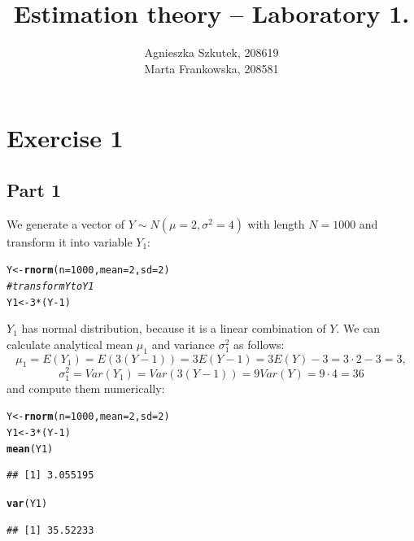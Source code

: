 \documentclass[12pt, a4paper]{article}\usepackage[]{graphicx}\usepackage[]{color}
\makeatletter
\newcommand{\hlnum}[1]{\textcolor[rgb]{0.686,0.059,0.569}{#1}}%
\newcommand{\hlcom}[1]{\textcolor[rgb]{0.678,0.584,0.686}{\textit{#1}}}%
\newcommand{\hlopt}[1]{\textcolor[rgb]{0,0,0}{#1}}%
\newcommand{\hlstd}[1]{\textcolor[rgb]{0.345,0.345,0.345}{#1}}%
\newcommand{\hlkwb}[1]{\textcolor[rgb]{0.69,0.353,0.396}{#1}}%
\newcommand{\hlkwc}[1]{\textcolor[rgb]{0.333,0.667,0.333}{#1}}%
\newcommand{\hlkwd}[1]{\textcolor[rgb]{0.737,0.353,0.396}{\textbf{#1}}}%
\newenvironment{kframe}{%
 \def\at@end@of@kframe{}%
 \ifinner\ifhmode%
  \def\at@end@of@kframe{\end{minipage}}%
  \begin{minipage}{\columnwidth}%
 \fi\fi%
 \def\FrameCommand##1{\hskip\@totalleftmargin \hskip-\fboxsep
 \colorbox{shadecolor}{##1}\hskip-\fboxsep
     \hskip-\linewidth \hskip-\@totalleftmargin \hskip\columnwidth}%
 \MakeFramed {\advance\hsize-\width
   \@totalleftmargin\z@ \linewidth\hsize
   \@setminipage}}%
 {\par\unskip\endMakeFramed%
 \at@end@of@kframe}
\newenvironment{knitrout}{}{} %
\makeatother
\begin{document}
\title{Estimation theory -- Laboratory 1.}
\author{Agnieszka Szkutek, 208619 \\ Marta Frankowska, 208581}
\maketitle
\tableofcontents 


\section{Exercise 1}

\subsection{Part 1}
We generate a vector of $Y\sim N(\mu=2, \sigma^2=4)$ with length $N = 1000$ and transform it into variable $Y_1$:
\begin{knitrout}
\color{fgcolor}\begin{kframe}
\begin{alltt}
\hlstd{Y} \hlkwb{<-} \hlkwd{rnorm}\hlstd{(}\hlkwc{n} \hlstd{=} \hlnum{1000}\hlstd{,} \hlkwc{mean} \hlstd{=} \hlnum{2}\hlstd{,} \hlkwc{sd} \hlstd{=} \hlnum{2}\hlstd{)}
\hlcom{# transform Y to Y1}
\hlstd{Y1} \hlkwb{<-} \hlnum{3} \hlopt{*} \hlstd{(Y} \hlopt{-} \hlnum{1}\hlstd{)}
\end{alltt}
\end{kframe}
\end{knitrout}
$Y_1$ has normal distribution, because it is a linear combination of $Y$. We can calculate analytical mean $\mu_1$ and variance $\sigma^2_1$ as follows:
\[ \mu_1 = E(Y_1) = E(3 (Y-1)) = 3 E(Y - 1) = 3 E(Y) - 3 = 3 \cdot 2 - 3 = 3,\]
\[ \sigma^2_1 = Var(Y_1) = Var(3 (Y-1)) = 9 Var(Y) = 9 \cdot 4 = 36 \]
and compute them numerically:
\begin{knitrout}
\color{fgcolor}\begin{kframe}
\begin{alltt}
\hlstd{Y} \hlkwb{<-} \hlkwd{rnorm}\hlstd{(}\hlkwc{n} \hlstd{=} \hlnum{1000}\hlstd{,} \hlkwc{mean} \hlstd{=} \hlnum{2}\hlstd{,} \hlkwc{sd} \hlstd{=} \hlnum{2}\hlstd{)}
\hlstd{Y1} \hlkwb{<-} \hlnum{3} \hlopt{*} \hlstd{(Y} \hlopt{-} \hlnum{1}\hlstd{)}
\hlkwd{mean}\hlstd{(Y1)}
\end{alltt}
\begin{verbatim}
## [1] 3.055195
\end{verbatim}
\begin{alltt}
\hlkwd{var}\hlstd{(Y1)}
\end{alltt}
\begin{verbatim}
## [1] 35.52233
\end{verbatim}
\end{kframe}
\end{knitrout}
\end{document}

